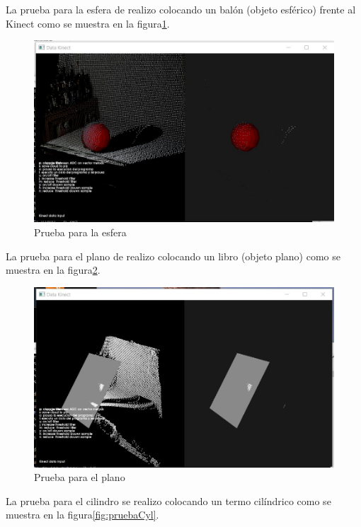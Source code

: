 	La prueba para la esfera de realizo colocando un balón (objeto esférico) frente al Kinect como se muestra en la figura\ref{fig:pruebaEsf}.

\begin{figure} [H]
	\centering
	\includegraphics[width=1\textwidth]{03Resultados/imagenes/esfera.JPG}
	\caption{Prueba para la esfera} 
	\label{fig:pruebaEsf}
\end{figure}


La prueba para el plano de realizo colocando un libro (objeto plano) como se muestra en la figura\ref{fig:pruebaPla}.


\begin{figure} [H]
	\centering
	\includegraphics[width=1\textwidth]{03Resultados/imagenes/plano.JPG}
	\caption{Prueba para el plano} 
	\label{fig:pruebaPla}
\end{figure}


La prueba para el cilindro se realizo colocando un  termo cilíndrico como se muestra en la figura\ref{fig:pruebaCyl}.


